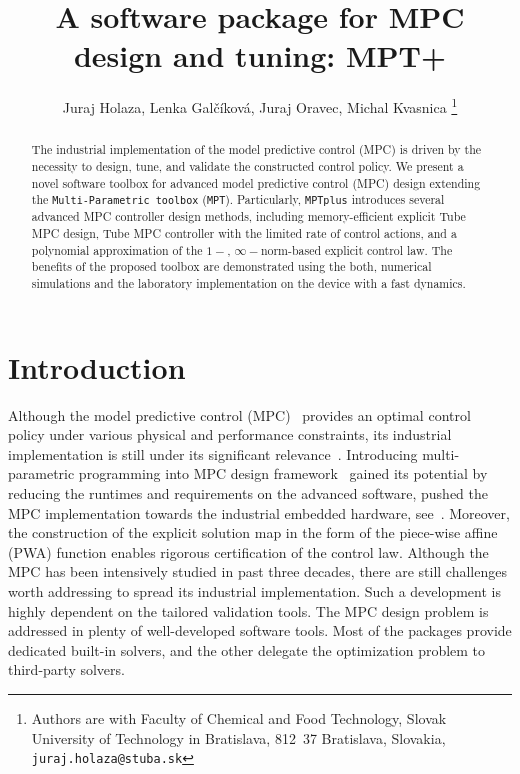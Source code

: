 \documentclass[letterpaper, 10 pt, conference]{ieeeconf}
\title{\LARGE \bf
A software package for MPC design and tuning: MPT+
}
\author{Juraj Holaza, Lenka Gal\v{c}\'{i}kov\'{a}, Juraj Oravec, Michal Kvasnica
	\thanks{Authors are with Faculty of Chemical and Food Technology,
		Slovak University of Technology in Bratislava, 812~37 Bratislava, Slovakia,
		\texttt{juraj.holaza@stuba.sk}}
}
\begin{document}
\maketitle
\thispagestyle{empty}
\pagestyle{empty}

\begin{abstract}

The industrial implementation of the model predictive control (MPC) is driven by the necessity to design, tune, and validate the constructed control policy. 
We present a novel software toolbox for advanced model predictive control (MPC) design extending the \texttt{Multi-Parametric toolbox} (\texttt{MPT}).  Particularly, \texttt{MPTplus} introduces several advanced MPC controller design methods, including memory-efficient explicit Tube MPC design, Tube MPC controller with the limited rate of control actions, and a polynomial approximation of the $1-$, $\infty-$norm-based explicit control law. The benefits of the proposed toolbox are demonstrated using the both, numerical simulations and the laboratory implementation on the device with a fast dynamics.  

\end{abstract}

\section{Introduction}
\label{sec:introduction}

Although the model predictive control (MPC)~\cite{M00, B17} provides an optimal control policy under various physical and performance constraints, its industrial implementation is still under its significant relevance~\cite{QB03}. 
Introducing multi-parametric programming into MPC design framework~\cite{BM02} gained its potential by reducing the runtimes and requirements on the advanced software, pushed the MPC implementation towards the industrial embedded hardware, see~\cite{PK21}. Moreover, the construction of the explicit solution map in the form of the piece-wise affine (PWA) function enables rigorous certification of the control law. 
%
Although the MPC has been intensively studied in past three decades, there are still challenges worth addressing to spread its industrial implementation. Such a development is highly dependent on the tailored validation tools. 
The MPC design problem is addressed in plenty of well-developed software tools. Most of the packages provide dedicated built-in solvers, and the other delegate the optimization problem to third-party solvers. 
\end{document}
